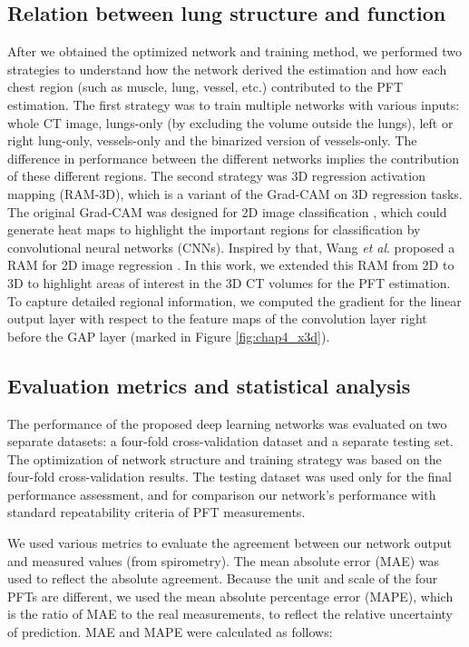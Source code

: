 \subsection{Relation between lung structure and function}
After we obtained the optimized network and training method, we performed two strategies to understand how the network derived the estimation and how each chest region (such as muscle, lung, vessel, etc.) contributed to the PFT estimation. The first strategy was to train multiple networks with various inputs: whole CT image, lungs-only (by excluding the volume outside the lungs), left or right lung-only, vessels-only and the binarized version of vessels-only. The difference in performance between the different networks implies the contribution of these different regions. The second strategy was 3D regression activation mapping (RAM-3D), which is a variant of the Grad-CAM  \cite{Selvaraju} on 3D regression tasks. The original Grad-CAM was designed for 2D image classification \cite{Selvaraju}, which could generate heat maps to highlight the important regions for classification by convolutional neural networks (CNNs). Inspired by that, Wang \textit{et al}. proposed a RAM for 2D image regression \cite{wang2017diabetic}. In this work, we extended this RAM from 2D to 3D to highlight areas of interest in the 3D CT volumes for the PFT estimation. To capture detailed regional information, we computed the gradient for the linear output layer with respect to the feature maps of the convolution layer right before the GAP layer (marked in Figure \ref{fig:chap4_x3d}).



\subsection{Evaluation metrics and statistical analysis}
The performance of the proposed deep learning networks was evaluated on two separate datasets: a four-fold cross-validation dataset and a separate testing set. The optimization of network structure and training strategy was based on the four-fold cross-validation results. The testing dataset was used only for the final performance assessment, and for comparison our network’s performance with standard repeatability criteria of PFT measurements.

We used various metrics to evaluate the agreement between our network output and measured values (from spirometry). The mean absolute error (MAE) was used to reflect the absolute agreement. Because the unit and scale of the four PFTs are different, we used the mean absolute percentage error (MAPE), which is the ratio of MAE to the real measurements, to reflect the relative uncertainty of prediction. MAE and MAPE were calculated as follows:

